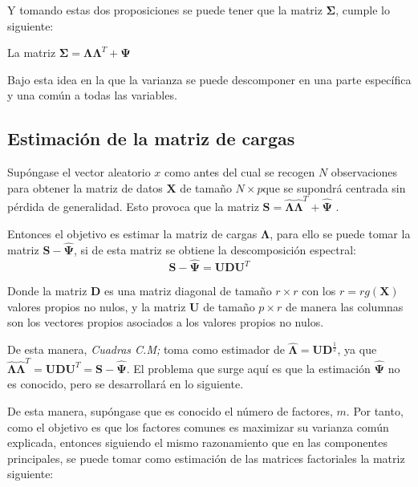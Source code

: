 \noindent Y tomando estas dos proposiciones se puede tener que la matriz $\mathbf{\Sigma}$, cumple lo siguiente:
\begin{coro}\label{Descomposición Varianza}
La matriz $\mathbf{\Sigma}=\mathbf{\Lambda}\mathbf{\Lambda}^T+\mathbf{\Psi}$
\end{coro}

\noindent Bajo esta idea en la que la varianza se puede descomponer en una parte específica y una común a todas las variables. 

\subsection{Estimación de la matriz de cargas}
\noindent Supóngase el vector aleatorio $x$ como antes del cual se recogen $N$ observaciones para obtener la matriz de datos $\mathbf{X}$ de tamaño $N\times p $que se supondrá centrada sin pérdida de generalidad. Esto provoca que la matriz $\mathbf{S}=\mathbf{\hat{\Lambda}}\mathbf{\hat{\Lambda}}^T+\mathbf{\hat{\Psi}}$ \cite{Peña 2002}. 

\noindent Entonces el objetivo es estimar la matriz de cargas $\mathbf{\Lambda}$, para ello se puede tomar la matriz $\mathbf{S}-\mathbf{\hat{\Psi}}$, si de esta matriz se obtiene la descomposición espectral:
\begin{equation}
\mathbf{S}-\mathbf{\hat{\Psi}}=\mathbf{U}\mathbf{D}\mathbf{U}^T
\end{equation}

\noindent Donde la matriz $\mathbf{D}$ es una matriz diagonal de tamaño $r\times r$ con los $r=rg(\mathbf{X})$ valores propios no nulos, y la matriz $\mathbf{U}$ de tamaño $p\times r$ de manera las columnas son los vectores propios asociados a los valores propios no nulos. 

\noindent De esta manera, \emph{Cuadras C.M;} \cite{Cuadras 2014} toma como estimador de $\mathbf{\hat{\Lambda}}=\mathbf{UD}^{\frac{1}{2}}$, ya que $\mathbf{\hat{\Lambda}}\mathbf{\hat{\Lambda}}^T=\mathbf{U}\mathbf{D}\mathbf{U}^T= \mathbf{S-\hat{\Psi}}$. El problema que surge aquí es que la estimación $\mathbf{\hat{\Psi}}$ no es conocido, pero se desarrollará en lo siguiente. 

\noindent De esta manera, supóngase que es conocido el número de factores, $m$. Por tanto, como el objetivo es que los factores comunes es maximizar su varianza común explicada, entonces siguiendo el mismo razonamiento que en las componentes principales, se puede tomar como estimación de las matrices factoriales la matriz siguiente:

